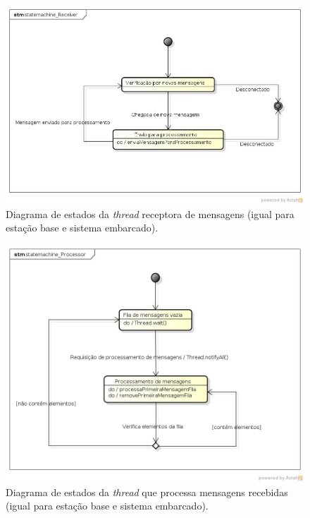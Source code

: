 \begin{figure}[H]
  \centering
  \includegraphics[width=\textwidth, keepaspectratio]{./figuras/statemachine_Receiver.jpg}
  \caption{Diagrama de estados da \textit{thread} receptora de mensagens (igual para estação base e sistema embarcado).}
  \label{fig:diagrama_estados_receiver}
\end{figure}

\begin{figure}[H]
  \centering
  \includegraphics[width=\textwidth, keepaspectratio]{./figuras/statemachine_Processor.jpg}
  \caption{Diagrama de estados da \textit{thread} que processa mensagens recebidas (igual para estação base e sistema embarcado).}
  \label{fig:diagrama_estados_processor}
\end{figure}


